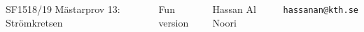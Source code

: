 \documentclass[aspectratio=1610]{beamer}
\begin{document}
\begin{frame}

  \vspace{0.02\textheight}
  
\begin{columns}[]
\column{37em}
\Large{\centerline{SF1518/19 Mästarprov 13: Strömkretsen}}
\large{\centerline{Fun version}}

\vspace{0.1\textheight}

\small{\centerline{Hassan Al Noori}}
\scriptsize{\centerline{\tt hassanan@kth.se}}
\scriptsize{\centerline{}}
\end{columns}
\end{frame}

\end{document}
